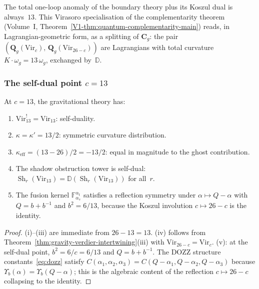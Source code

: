 The total one-loop anomaly of the boundary theory plus its
Koszul dual is always~$13$. This Virasoro specialisation of
the complementarity theorem (Volume~I,
Theorem~\ref{V1-thm:quantum-complementarity-main}) reads, in
Lagrangian-geometric form, as a splitting of $\mathbf{C}_g$:
the pair $(\mathbf{Q}_g(\mathrm{Vir}_c),\,
\mathbf{Q}_g(\mathrm{Vir}_{26-c}))$ are Lagrangians with total
curvature $K \cdot \omega_g = 13\,\omega_g$, exchanged
by~$\mathbb{D}$.

\subsubsection*{The self-dual point $c = 13$}

\begin{proposition}[Self-duality at $c = 13$;
\ClaimStatusProvedHere]
\label{prop:gravity-self-dual-13}
At $c = 13$, the gravitational theory has:
\begin{enumerate}[label=\textup{(\roman*)}]
\item $\mathrm{Vir}_{13}^! = \mathrm{Vir}_{13}$:
 self-duality.
\item $\kappa = \kappa' = 13/2$: symmetric curvature
 distribution.
\item $\kappa_{\mathrm{eff}} = (13-26)/2 = -13/2$:
 equal in magnitude to the ghost contribution.
\item The shadow obstruction tower is self-dual:
 $\operatorname{Sh}_r(\mathrm{Vir}_{13})
 = \mathbb{D}(\operatorname{Sh}_r(\mathrm{Vir}_{13}))$
 for all~$r$.
\item The fusion kernel $\mathbb{F}_{\alpha_s}^{\alpha_t}$
 satisfies a reflection symmetry under $\alpha \mapsto Q - \alpha$
 with $Q = b + b^{-1}$ and $b^2 = 6/13$, because the
 Koszul involution $c \mapsto 26 - c$ is the identity.
\end{enumerate}
\end{proposition}

\begin{proof}
(i)--(iii) are immediate from $26 - 13 = 13$. (iv) follows from
Theorem~\ref{thm:gravity-verdier-intertwining}(iii) with
$\mathrm{Vir}_{26-c} = \mathrm{Vir}_c$. (v): at the
self-dual point, $b^2 = 6/c = 6/13$ and $Q = b + b^{-1}$. The
DOZZ structure constants~\eqref{eq:dozz} satisfy
$C(\alpha_1, \alpha_2, \alpha_3)
= C(Q - \alpha_1, Q - \alpha_2, Q - \alpha_3)$
because $\Upsilon_b(\alpha) = \Upsilon_b(Q - \alpha)$; this
is the algebraic content of the reflection $c \mapsto 26 - c$
collapsing to the identity.
\end{proof}

